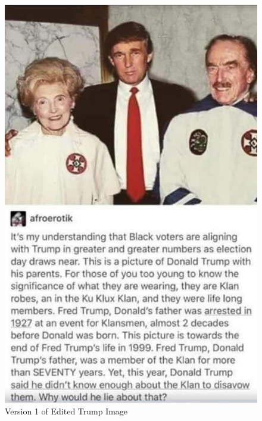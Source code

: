 \documentclass[preprint,review,12pt]{elsarticle}
\begin{document}
 \begin{figure}[h]
  \includegraphics[width=\linewidth]{trumpkkk1.jpg}
  \caption{Version 1 of Edited Trump Image}\label{fig:TrumpKKK1}
\endminipage\hfill
{}

\end{figure}
\end{document}
